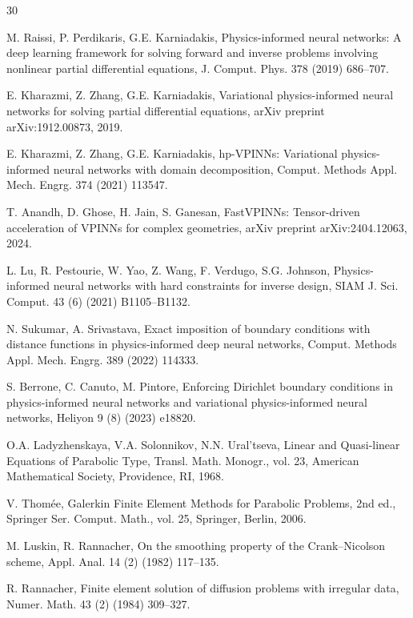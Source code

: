 \documentclass[a4paper,fleqn]{cas-sc}
\begin{document}
\begin{thebibliography}{30}

M. Raissi, P. Perdikaris, G.E. Karniadakis, Physics-informed neural networks: A deep learning framework for solving
forward and inverse problems involving nonlinear partial differential equations, J. Comput. Phys. 378 (2019) 686--707.

E. Kharazmi, Z. Zhang, G.E. Karniadakis, Variational physics-informed neural networks for solving partial
differential equations, arXiv preprint arXiv:1912.00873, 2019.

E. Kharazmi, Z. Zhang, G.E. Karniadakis, hp-VPINNs: Variational physics-informed neural networks with domain
decomposition, Comput. Methods Appl. Mech. Engrg. 374 (2021) 113547.

T. Anandh, D. Ghose, H. Jain, S. Ganesan, FastVPINNs: Tensor-driven acceleration of VPINNs for complex geometries,
arXiv preprint arXiv:2404.12063, 2024.

L. Lu, R. Pestourie, W. Yao, Z. Wang, F. Verdugo, S.G. Johnson, Physics-informed neural networks with hard constraints
for inverse design, SIAM J. Sci. Comput. 43 (6) (2021) B1105--B1132.

N. Sukumar, A. Srivastava, Exact imposition of boundary conditions with distance functions in physics-informed deep
neural networks, Comput. Methods Appl. Mech. Engrg. 389 (2022) 114333.

S. Berrone, C. Canuto, M. Pintore, Enforcing Dirichlet boundary conditions in physics-informed neural networks and
variational physics-informed neural networks, Heliyon 9 (8) (2023) e18820.

O.A. Ladyzhenskaya, V.A. Solonnikov, N.N. Ural'tseva, Linear and Quasi-linear Equations of Parabolic Type, Transl.
Math. Monogr., vol. 23, American Mathematical Society, Providence, RI, 1968.

V. Thom\'ee, Galerkin Finite Element Methods for Parabolic Problems, 2nd ed., Springer Ser. Comput. Math., vol. 25,
Springer, Berlin, 2006.

M. Luskin, R. Rannacher, On the smoothing property of the Crank--Nicolson scheme, Appl. Anal. 14 (2) (1982) 117--135.

R. Rannacher, Finite element solution of diffusion problems with irregular data, Numer. Math. 43 (2) (1984) 309--327.


\end{thebibliography}
\end{document}
